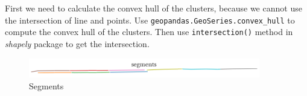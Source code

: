 \documentclass[fontset=none]{ctexart}
\theoremstyle{definition}
\theoremstyle{remark}
\begin{document}
First we need to calculate the convex hull of the clusters, because we cannot use the intersection
of line and points. Use \texttt{geopandas.GeoSeries.convex\_hull} to compute the convex hull of the
clusters. Then use \texttt{intersection()} method in \textit{shapely} package to get the intersection.
\begin{figure}[htb]
  \centering
  \includegraphics[width=0.9\textwidth]{images/segments.png}
  \caption{Segments}
  \label{fig: segments}
\end{figure}

% 
% 
\end{document}
